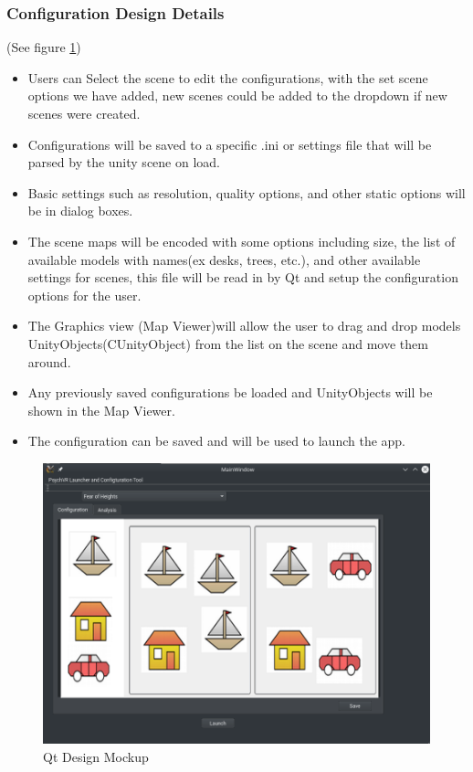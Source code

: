 \documentclass[a4paper,10pt]{article}
\begin{document}
\subsubsection {Configuration Design Details}
(See figure \ref{fig:qtMockupMap})
\begin{itemize}
\item Users can Select the scene to edit the configurations, with the set scene options we have added, new scenes could be added to the dropdown if new scenes were created.
\item Configurations will be saved to a specific .ini or settings file that will be parsed by the unity scene on load.
\item Basic settings such as resolution, quality options, and other static options will be in dialog boxes.
\item The scene maps will be encoded with some options including size, the list of available models with names(ex desks, trees, etc.), and other available settings for scenes, this file will be read in by Qt and setup the configuration options for the user.
\item The Graphics view (Map Viewer)will allow the user to drag and drop models UnityObjects(CUnityObject) from the list on the scene and move them around.
\item Any previously saved configurations be loaded and UnityObjects will be shown in the Map Viewer.
\item The configuration can be saved and will be used to launch the app.

\end{itemize}
\begin{figure}[H]
				      \centerline{\includegraphics[scale = 0.35]{qtConfigMap.png}}
					\caption{Qt Design Mockup}
					\label{fig:qtMockupMap}
				\end{figure}
\pagebreak
\end{document}

